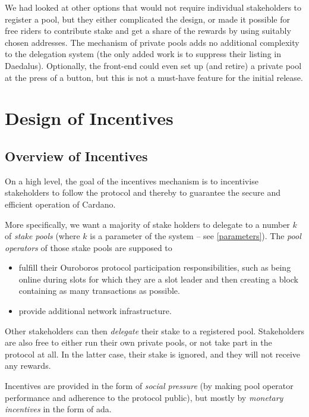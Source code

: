 \documentclass[11pt,a4paper,dvipsnames,twosided]{article}
\begin{document}
We had looked at other options that would not require individual
stakeholders to register a pool, but they either complicated the
design, or made it possible for free riders to contribute stake and
get a share of the rewards by using suitably chosen addresses. The
mechanism of private pools adds no additional complexity to the
delegation system (the only added work is to suppress their listing in
Daedalus). Optionally, the front-end could even set up (and retire) a
private pool at the press of a button, but this is not a must-have
feature for the initial release.

\section{Design of Incentives}
\label{design-of-incentives}

\subsection{Overview of Incentives}
\label{overview-of-incentives}

On a high level, the goal of the incentives mechanism is to incentivise
stakeholders to follow the protocol and thereby to guarantee the secure and
efficient operation of Cardano.

More specifically, we want a majority of stake holders to
delegate to a number \(k\) of \emph{stake pools} (where \(k\) is a
parameter of the system -- see \cref{parameters}). The
\emph{pool operators} of those stake pools are supposed to

\begin{itemize}
\item
  fulfill their Ouroboros protocol participation responsibilities,
  such as being online during slots for which they are a slot leader and
  then creating a block containing as many transactions as possible.
\item
  provide additional network infrastructure.
\end{itemize}

Other stakeholders can then \emph{delegate} their stake to a registered
pool.  Stakeholders are also free to either run their own private
pools, or not take part in the protocol at all. In the latter case,
their stake is ignored, and they will not receive any rewards.

Incentives are provided in the form of \emph{social pressure} (by making
pool operator performance and adherence to the protocol public), but
mostly by \emph{monetary incentives} in the form of ada.
\end{document}
